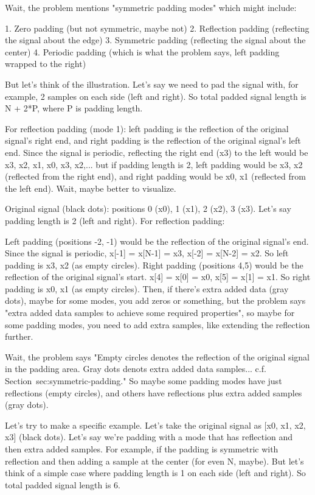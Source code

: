 Wait, the problem mentions "symmetric padding modes" which might include:

1. Zero padding (but not symmetric, maybe not)
2. Reflection padding (reflecting the signal about the edge)
3. Symmetric padding (reflecting the signal about the center)
4. Periodic padding (which is what the problem says, left padding wrapped to the right)

But let's think of the illustration. Let's say we need to pad the signal with, for example, 2 samples on each side (left and right). So total padded signal length is N + 2*P, where P is padding length.

For reflection padding (mode 1): left padding is the reflection of the original signal's right end, and right padding is the reflection of the original signal's left end. Since the signal is periodic, reflecting the right end (x3) to the left would be x3, x2, x1, x0, x3, x2,... but if padding length is 2, left padding would be x3, x2 (reflected from the right end), and right padding would be x0, x1 (reflected from the left end). Wait, maybe better to visualize.

Original signal (black dots): positions 0 (x0), 1 (x1), 2 (x2), 3 (x3). Let's say padding length is 2 (left and right). For reflection padding:

Left padding (positions -2, -1) would be the reflection of the original signal's end. Since the signal is periodic, x[-1] = x[N-1] = x3, x[-2] = x[N-2] = x2. So left padding is x3, x2 (as empty circles). Right padding (positions 4,5) would be the reflection of the original signal's start. x[4] = x[0] = x0, x[5] = x[1] = x1. So right padding is x0, x1 (as empty circles). Then, if there's extra added data (gray dots), maybe for some modes, you add zeros or something, but the problem says "extra added data samples to achieve some required properties", so maybe for some padding modes, you need to add extra samples, like extending the reflection further.

Wait, the problem says "Empty circles denotes the reflection of the original signal in the padding area. Gray dots denots extra added data samples... c.f. Section~sec:symmetric-padding." So maybe some padding modes have just reflections (empty circles), and others have reflections plus extra added samples (gray dots).

Let's try to make a specific example. Let's take the original signal as [x0, x1, x2, x3] (black dots). Let's say we're padding with a mode that has reflection and then extra added samples. For example, if the padding is symmetric with reflection and then adding a sample at the center (for even N, maybe). But let's think of a simple case where padding length is 1 on each side (left and right). So total padded signal length is 6.

